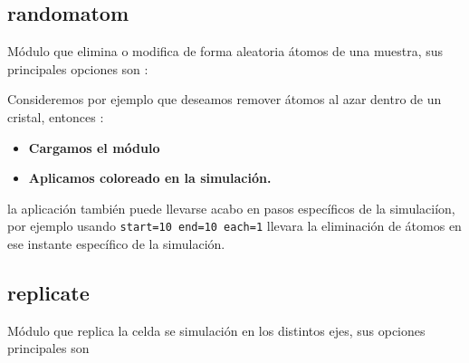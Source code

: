 \subsection{randomatom}
M\'odulo que elimina o modifica de forma aleatoria \'atomos de una muestra, sus principales opciones son : 


Consideremos por ejemplo que deseamos remover \'atomos al azar dentro de un cristal, entonces :

\begin{itemize}
 \item \textbf{Cargamos el m\'odulo}
 \item \textbf{Aplicamos coloreado en la simulaci\'on.}
\end{itemize}

la aplicaci\'on tambi\'en puede llevarse acabo en pasos espec\'ificos de la simulaci\'ion, por ejemplo usando \texttt{start=10 end=10 each=1} llevara la eliminaci\'on de \'atomos en ese instante espec\'ifico de la simulaci\'on.

\subsection{replicate}
M\'odulo que replica la celda se simulaci\'on en los distintos ejes, sus opciones principales son


